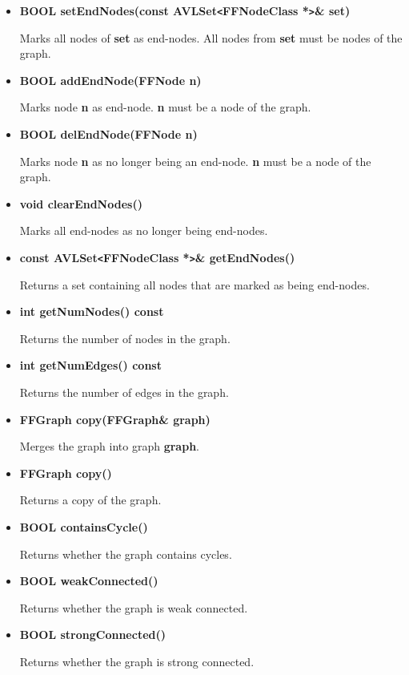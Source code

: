 \begin{itemize}
\item{\bf BOOL setEndNodes(const AVLSet\verb|<|FFNodeClass
    *\verb|>|\& set)}
  
  Marks all nodes of {\bf set} as end-nodes. All nodes from {\bf
    set} must be nodes of the graph.

\item{\bf BOOL addEndNode(FFNode n)}
  
  Marks node {\bf n} as end-node. {\bf n} must be a node of the
  graph.

\item{\bf BOOL delEndNode(FFNode n)}
  
  Marks node {\bf n} as no longer being an end-node. {\bf n} must
  be a node of the graph.

\item{\bf void clearEndNodes()}

Marks all end-nodes as no longer being end-nodes.

\item{\bf const AVLSet\verb|<|FFNodeClass *\verb|>|\& getEndNodes()}
  
  Returns a set containing all nodes that are marked as being
  end-nodes.
  
\item{\bf int getNumNodes() const}

Returns the number of nodes in the graph.

\item{\bf int getNumEdges() const}    

Returns the number of edges in the graph.

\item{\bf FFGraph copy(FFGraph\& graph)}

Merges the graph into graph {\bf graph}. 

\item{\bf FFGraph copy()}

Returns a copy of the graph.

\item{\bf BOOL containsCycle()}

Returns whether the graph contains cycles.

\item{\bf BOOL weakConnected()}

Returns whether the graph is weak connected.

\item{\bf BOOL strongConnected()}

Returns whether the graph is strong connected.


\end{itemize}
